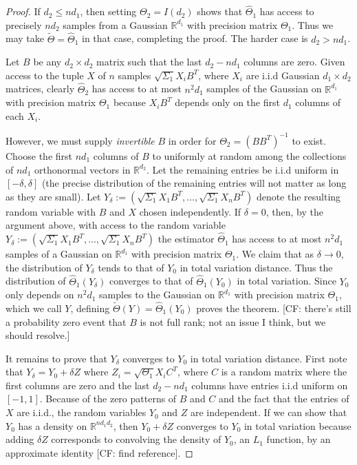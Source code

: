\documentclass[aos]{imsart}
\theoremstyle{definition}
\numberwithin{equation}{section}
\newcommand{\R}{{\mathbb{R}}}
\newcommand{\htheta}{\widehat{\Theta}}
\newcommand{\CF}[1]{{\color{purple}[CF: #1]}}
\begin{document}
\begin{proof}
If $d_2 \leq nd_1$, then setting $\Theta_2 = I(d_2)$ shows that $\htheta_1$ has access to precisely $n d_2$ samples from a Gaussian $\R^{d_1}$ with precision matrix $\Theta_1$. Thus we may take $\tilde{\Theta} = \htheta_1$ in that case, completing the proof. The harder case is $d_2 > n d_1$. 

Let $B$ be any $d_2\times d_2$ matrix such that the last $d_2 - nd_1$ columns are zero. Given access to the tuple $X$ of $n$ samples $\sqrt{\Sigma_1} X_i B^T$, where $X_i$ are i.i.d Gaussian $d_1\times d_2$ matrices, clearly $\widehat{\Theta}_2$ has access to at most $n^2 d_1$ samples of the Gaussian on $\R^{d_1}$ with precision matrix $\Theta_1$ because $X_i B^T$ depends only on the first $d_1$ columns of each $X_i$.

However, we must supply \emph{invertible} $B$ in order for $\Theta_2 = (BB^T)^{-1}$ to exist. Choose the first $nd_1$ columns of $B$ to uniformly at random among the collections of $nd_1$ orthonormal vectors in $\R^{d_2}$. Let the remaining entries be i.i.d uniform in $[-\delta, \delta]$ (the precise distribution of the remaining entries will not matter as long as they are small). Let $Y_\delta:=(\sqrt{\Sigma_1} X_1 B^T, \dots, \sqrt{\Sigma_1} X_n B^T)$ denote the resulting random variable with $B$ and $X$ chosen independently. If $\delta = 0$, then, by the argument above, with access to the random variable $Y_\delta:=(\sqrt{\Sigma_1} X_1 B^T, \dots, \sqrt{\Sigma_1} X_n B^T)$ the estimator $\widehat{\Theta}_1$ has access to at most $n^2d_1$ samples of a Gaussian on $\R^{d_1}$ with precision matrix $\Theta_1$. We claim that as $\delta \to 0$, the distribution of $Y_\delta$ tends to that of $Y_0$ in total variation distance. Thus the distribution of $\widehat{\Theta}_1(Y_\delta)$ converges to that of $\widehat{\Theta}_1(Y_0)$ in total variation. Since $Y_0$ only depends on $n^2d_1$ samples to the Gaussian on $\R^{d_1}$ with precision matrix $\Theta_1$, which we call $Y$, defining $\tilde{\Theta}(Y) = \widehat{\Theta}_1(Y_0)$ proves the theorem. \CF{there's still a probability zero event that $B$ is not full rank; not an issue I think, but we should resolve.}

It remains to prove that $Y_\delta$ converges to $Y_0$ in total variation distance. First note that $Y_\delta = Y_0 + \delta Z$ where $Z_i = \sqrt{\Theta_1} X_i C^T$, where $C$ is a random matrix where the first columns are zero and the last $d_2 - n d_1$ columns have entries i.i.d uniform on $[-1, 1]$. Because of the zero patterns of $B$ and $C$ and the fact that the entries of $X$ are i.i.d., the random variables $Y_0$ and $Z$ are independent. If we can show that $Y_0$ has a density on $\R^{nd_1d_2}$, then $Y_0 + \delta Z$ converges to $Y_0$ in total variation because adding $\delta Z$ corresponds to convolving the density of $Y_0$, an $L_1$ function, by an approximate identity \CF{find reference}.


\end{proof}
\end{document}
